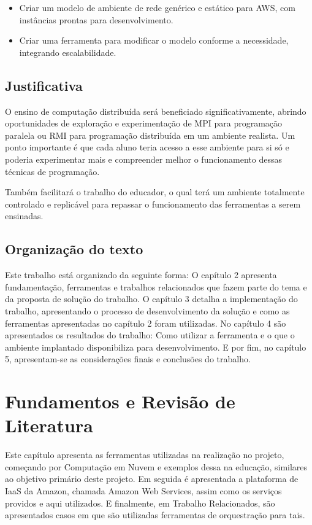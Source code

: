\documentclass[tg]{mdtufsm}
\begin{document}
\begin{itemize}
\item Criar um modelo de ambiente de rede genérico e estático para AWS, com instâncias prontas para desenvolvimento.
\item Criar uma ferramenta para modificar o modelo conforme a necessidade, integrando escalabilidade.
\end{itemize}

\section{Justificativa}

O ensino de computação distribuída será beneficiado significativamente, abrindo oportunidades de exploração e experimentação de MPI para programação paralela ou RMI para programação distribuída em um ambiente realista. Um ponto importante é que cada aluno teria acesso a esse ambiente para si só e poderia experimentar mais e compreender melhor o funcionamento dessas técnicas de programação.

Também facilitará o trabalho do educador, o qual terá um ambiente totalmente controlado e replicável para repassar o funcionamento das ferramentas a serem ensinadas.

\section{Organização do texto}

Este trabalho está organizado da seguinte forma: O capítulo 2 apresenta fundamentação, ferramentas e trabalhos relacionados que fazem parte do tema e da proposta de solução do trabalho.
O capítulo 3 detalha a implementação do trabalho, apresentando o processo de desenvolvimento da solução e como as ferramentas apresentadas no capítulo 2 foram utilizadas.
No capítulo 4 são apresentados os resultados do trabalho: Como utilizar a ferramenta e o que o ambiente implantado disponibiliza para desenvolvimento. E por fim, no capítulo 5, apresentam-se as considerações finais e conclusões do trabalho.

\chapter{Fundamentos e Revisão de Literatura}

Este capítulo apresenta as ferramentas utilizadas na realização no projeto, começando por Computação em Nuvem e exemplos dessa na educação, similares ao objetivo primário deste projeto. Em seguida é apresentada a plataforma de IaaS da Amazon, chamada Amazon Web Services, assim como os serviços providos e aqui utilizados. E finalmente, em Trabalho Relacionados, são apresentados casos em que são utilizadas ferramentas de orquestração para tais.
\end{document}
